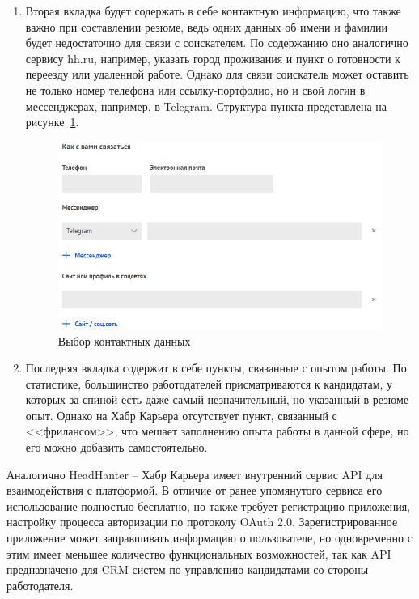 \documentclass[master, och, diploma]{SCWorks}
\begin{document}
\begin{enumerate}
    \item Вторая вкладка будет содержать в себе контактную информацию, что также важно при составлении резюме, ведь одних данных об имени и фамилии будет недостаточно для связи с соискателем. По содержанию оно аналогично сервису hh.ru, например, указать город проживания и пункт о готовности к переезду или удаленной работе. Однако для связи соискатель может оставить не только номер телефона или ссылку-портфолио, но и свой логин в мессенджерах, например, в Telegram. Структура пункта представлена на рисунке~\ref{fig:8}.
    \begin{figure}[!ht]
        \centering
        \includegraphics[width=12cm]{images/image2.png}
        \caption{\label{fig:8}%
            Выбор контактных данных}
    \end{figure}

    \item Последняя вкладка содержит в себе пункты, связанные с опытом работы. По статистике, большинство работодателей присматриваются к кандидатам, у которых за спиной есть даже самый незначительный, но указанный в резюме опыт. Однако на Хабр Карьера отсутствует пункт, связанный с <<фрилансом>>, что мешает заполнению опыта работы в данной сфере, но его можно добавить самостоятельно.
\end{enumerate}

Аналогично HeadHanter – Хабр Карьера имеет внутренний сервис API для взаимодействия с платформой. В отличие от ранее упомянутого сервиса его использование полностью бесплатно, но также требует регистрацию приложения, настройку процесса авторизации по протоколу OAuth 2.0. Зарегистрированное приложение может заправшивать информацию о пользователе, но одновременно с этим имеет меньшее количество функциональных возможностей, так как API предназначено для CRM-систем по управлению кандидатами со стороны работодателя\cite{habr_api}.
\end{document}
